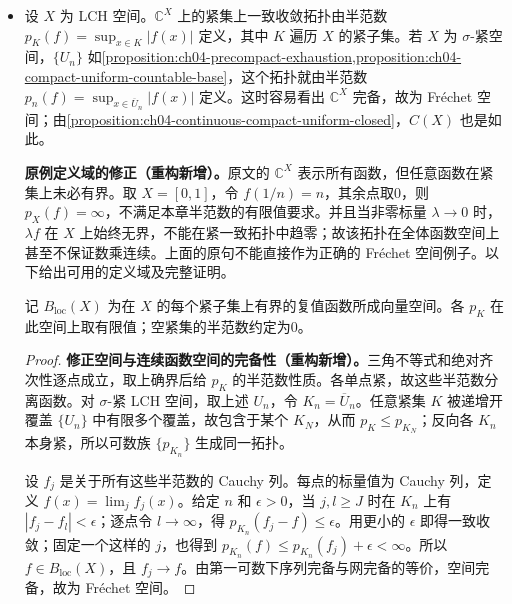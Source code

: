 \documentclass[../../main.tex]{subfiles}
\begin{document}
\begin{examples}\label{examples:ch05-frechet-examples}
\begin{itemize}
\item
设 $X$ 为 LCH 空间。$\mathbb C^X$ 上的紧集上一致收敛拓扑由半范数 $p_K(f)=\sup_{x\in K}|f(x)|$ 定义，其中 $K$ 遍历 $X$ 的紧子集。若 $X$ 为 $\sigma$-紧空间，$\{U_n\}$ 如\cref{proposition:ch04-precompact-exhaustion,proposition:ch04-compact-uniform-countable-base}，这个拓扑就由半范数 $p_n(f)=\sup_{x\in\overline U_n}|f(x)|$ 定义。这时容易看出 $\mathbb C^X$ 完备，故为 Fr\'echet 空间；由\cref{proposition:ch04-continuous-compact-uniform-closed}，$C(X)$ 也是如此。
\begin{remark}
\textbf{原例定义域的修正（重构新增）。}原文的 $\mathbb C^X$ 表示所有函数，但任意函数在紧集上未必有界。取 $X=[0,1]$，令 $f(1/n)=n$，其余点取0，则 $p_X(f)=\infty$，不满足本章半范数的有限值要求。并且当非零标量 $\lambda\to0$ 时，$\lambda f$ 在 $X$ 上始终无界，不能在紧一致拓扑中趋零；故该拓扑在全体函数空间上甚至不保证数乘连续。上面的原句不能直接作为正确的 Fr\'echet 空间例子。以下给出可用的定义域及完整证明。
\end{remark}
\begin{definition*}\label{definition:ch05-compactly-bounded-functions}
记 $B_{\mathrm{loc}}(X)$ 为在 $X$ 的每个紧子集上有界的复值函数所成向量空间。各 $p_K$ 在此空间上取有限值；空紧集的半范数约定为0。
\end{definition*}
\begin{proof}
\textbf{修正空间与连续函数空间的完备性（重构新增）。}三角不等式和绝对齐次性逐点成立，取上确界后给 $p_K$ 的半范数性质。各单点紧，故这些半范数分离函数。对 $\sigma$-紧 LCH 空间，取上述 $U_n$，令 $K_n=\overline U_n$。任意紧集 $K$ 被递增开覆盖 $\{U_n\}$ 中有限多个覆盖，故包含于某个 $K_N$，从而 $p_K\le p_{K_N}$；反向各 $K_n$ 本身紧，所以可数族 $\{p_{K_n}\}$ 生成同一拓扑。

设 $f_j$ 是关于所有这些半范数的 Cauchy 列。每点的标量值为 Cauchy 列，定义 $f(x)=\lim_j f_j(x)$。给定 $n$ 和 $\epsilon>0$，当 $j,l\ge J$ 时在 $K_n$ 上有 $|f_j-f_l|<\epsilon$；逐点令 $l\to\infty$，得 $p_{K_n}(f_j-f)\le\epsilon$。用更小的 $\epsilon$ 即得一致收敛；固定一个这样的 $j$，也得到 $p_{K_n}(f)\le p_{K_n}(f_j)+\epsilon<\infty$。所以 $f\in B_{\mathrm{loc}}(X)$，且 $f_j\to f$。由第一可数下序列完备与网完备的等价，空间完备，故为 Fr\'echet 空间。


\end{proof}
\end{itemize}
\end{examples}
\end{document}
